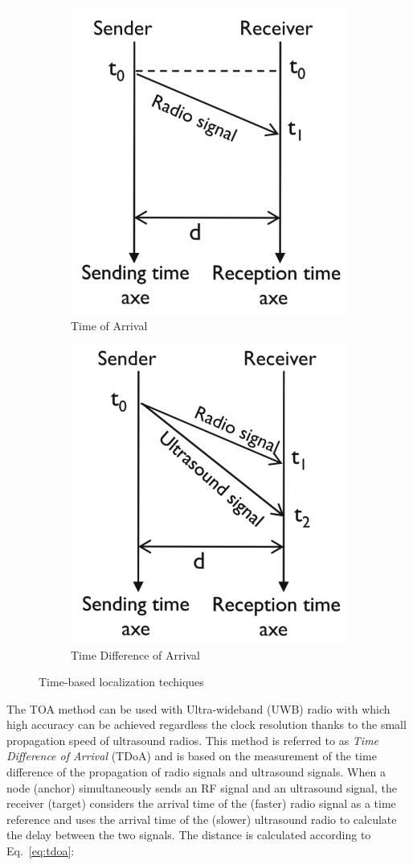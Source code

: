 \documentclass[a4paper,12pt]{article}
\begin{document}
\begin{enumerate}
\begin{enumerate}[label=(\roman*)]
    \begin{figure}[b]
    \centering
    \begin{subfigure}{.5\textwidth}
      \centering
      \includegraphics[width=.4\linewidth]{img/toa}
      \caption{Time of Arrival}
    \end{subfigure}%
    \begin{subfigure}{.5\textwidth}
      \centering
      \includegraphics[width=.4\linewidth]{img/tdoa}
      \caption{Time Difference of Arrival}
    \end{subfigure}
    \caption{Time-based localization techiques}
    \end{figure}

    The TOA method can be used with Ultra-wideband (UWB) radio with which high accuracy can be achieved regardless the clock resolution thanks to the small propagation speed of ultrasound radios. This method is referred to as \textit{Time Difference of Arrival} (TDoA) and is based on the measurement of the time difference of the propagation of radio signals and ultrasound signals. When a node (anchor) simultaneously sends an RF signal and an ultrasound signal, the receiver (target) considers the arrival time of the (faster) radio signal as a time reference and uses the arrival time of the (slower) ultrasound radio to calculate the delay between the two signals. The distance is calculated according to Eq.~\ref{eq:tdoa}:


\end{enumerate}
\end{enumerate}
\end{document}

